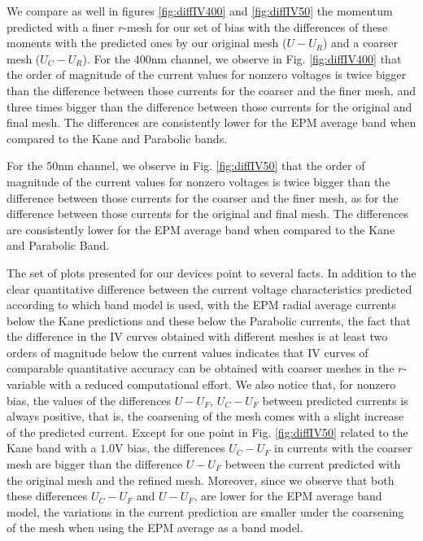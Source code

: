 \documentclass[11pt]{article}
\begin{document}
We compare as well in figures \ref{fig:diffIV400} and \ref{fig:diffIV50}
the momentum predicted with a finer $r$-mesh for our set of bias with the differences of these moments with the predicted ones by our original mesh ($U - U_R$) and a coarser mesh ($U_C - U_R$).
For the 400nm channel, we observe in Fig. \ref{fig:diffIV400} that the order of magnitude of the current values for nonzero voltages is twice bigger than the difference between those currents for the coarser and the finer mesh, and three times bigger than the difference between those currents for the original and final mesh. The differences are consistently lower for the EPM average band when compared to the Kane and Parabolic bands. 

For the 50nm channel, we observe in Fig. \ref{fig:diffIV50}
that the order of magnitude of the current values for nonzero voltages is twice bigger than the difference between those currents for the coarser and the finer mesh, as for the difference between those currents for the original and final mesh. The differences are consistently lower for the EPM average band when compared to the Kane and Parabolic Band.

The set of plots presented for our devices point to several facts.
In addition to the clear quantitative difference between the current voltage characteristics predicted according to which band model is used, with the EPM radial average currents below the Kane predictions and these below the Parabolic currents, the fact that the difference in the IV curves obtained with different meshes is at least two orders of magnitude below the current values indicates that IV curves of comparable quantitative accuracy can be obtained with coarser meshes in the $r$-variable with a reduced computational effort. We also notice that, for nonzero bias, the values of the differences $U-U_F$, $U_C-U_F$ between predicted currents is always positive, that is, the coarsening of the mesh comes with a slight increase of the predicted current. Except for one point in Fig. \ref{fig:diffIV50} related to the Kane band with a $1.0$V bias, the differences $U_C-U_F$ in currents with the coarser mesh are bigger than the difference $U-U_F$ between the current predicted with the original mesh and the refined mesh. Moreover, 
since we observe that both these differences $U_C-U_F$ and $U-U_F$, 
are lower for the EPM average band model, 
the variations in the current prediction are smaller under the coarsening of the mesh when using the EPM average as a band model. 
\end{document}
